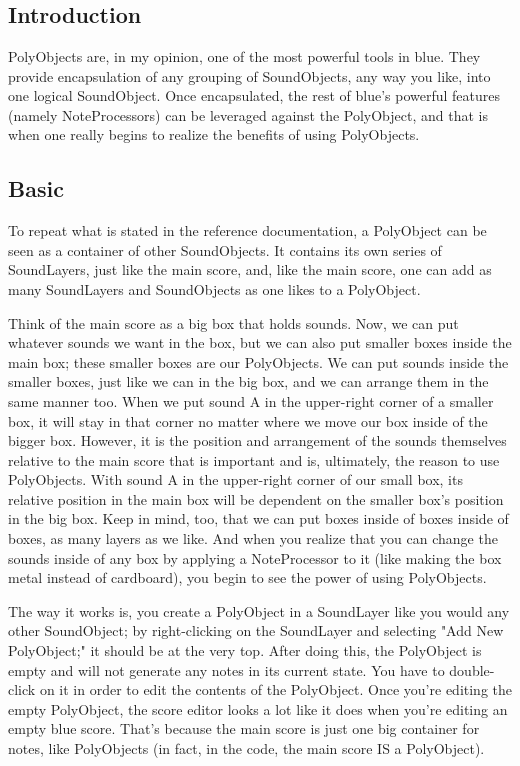 \section{}\label{conceptsPolyObjects}

\subsection{Introduction}

PolyObjects are, in my opinion, one of the most powerful tools in blue.
They provide encapsulation of any grouping of SoundObjects, any way you
like, into one logical SoundObject. Once encapsulated, the rest of
blue's powerful features (namely NoteProcessors) can be leveraged
against the PolyObject, and that is when one really begins to realize
the benefits of using PolyObjects.

\subsection{Basic}

To repeat what is stated in the reference documentation, a PolyObject
can be seen as a container of other SoundObjects. It contains its own
series of SoundLayers, just like the main score, and, like the main
score, one can add as many SoundLayers and SoundObjects as one likes to
a PolyObject.

Think of the main score as a big box that holds sounds. Now, we can put
whatever sounds we want in the box, but we can also put smaller boxes
inside the main box; these smaller boxes are our PolyObjects. We can put
sounds inside the smaller boxes, just like we can in the big box, and we
can arrange them in the same manner too. When we put sound A in the
upper-right corner of a smaller box, it will stay in that corner no
matter where we move our box inside of the bigger box. However, it is
the position and arrangement of the sounds themselves relative to the
main score that is important and is, ultimately, the reason to use
PolyObjects. With sound A in the upper-right corner of our small box,
its relative position in the main box will be dependent on the smaller
box's position in the big box. Keep in mind, too, that we can put boxes
inside of boxes inside of boxes, as many layers as we like. And when you
realize that you can change the sounds inside of any box by applying a
NoteProcessor to it (like making the box metal instead of cardboard),
you begin to see the power of using PolyObjects.

The way it works is, you create a PolyObject in a SoundLayer like you
would any other SoundObject; by right-clicking on the SoundLayer and
selecting "Add New PolyObject;" it should be at the very top. After
doing this, the PolyObject is empty and will not generate any notes in
its current state. You have to double-click on it in order to edit the
contents of the PolyObject. Once you're editing the empty PolyObject,
the score editor looks a lot like it does when you're editing an empty
blue score. That's because the main score is just one big container for
notes, like PolyObjects (in fact, in the code, the main score IS a
PolyObject).

